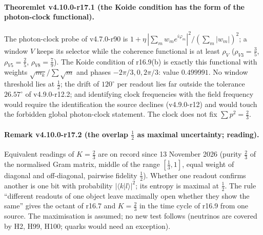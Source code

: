 \paragraph{Theoremlet v4.10.0-r17.1 (the Koide condition has the form of the photon-clock functional).}
The photon-clock probe of v4.7.0-r90 is \(1+\eta\,|\sum_mw_me^{i\varphi_m}|^2/(\sum_m|w_m|)^2\); a window \(V\) keeps its selector while the
coherence functional is at least \(\rho_V\) (\(\rho_{V3}=\tfrac35\), \(\rho_{V5}=\tfrac25\), \(\rho_{V8}=\tfrac79\)).  The Koide condition of r16.9(b) is exactly
this functional with weights \(\sqrt{m_k}/\sum\sqrt m\) and phases \(-2\pi/3,0,2\pi/3\): value \(0.499991\).  No window threshold lies at
\(\tfrac12\); the drift of \(120^\circ\) per readout lies far outside the tolerance \(26.57^\circ\) of v4.9.0-r12.2; and identifying clock
frequencies with the field frequency would require the identification the source declines (v4.9.0-r12) and would touch the
forbidden global photon-clock statement.  The clock does not fix \(\sum p^2=\tfrac23\).

\paragraph{Remark v4.10.0-r17.2 (the overlap \(\tfrac12\) as maximal uncertainty; reading).}
Equivalent readings of \(K=\tfrac23\) are on record since 13 November 2026 (purity \(\tfrac23\) of the normalised Gram matrix, middle of the
range \([\tfrac13,1]\), equal weight of diagonal and off-diagonal, pairwise fidelity \(\tfrac12\)).  Whether one readout confirms another is
one bit with probability \(|\langle k|l\rangle|^2\); its entropy is maximal at \(\tfrac12\).  The rule ``different readouts of one object leave
maximally open whether they show the same'' gives the octant of r16.7 and \(K=\tfrac23\) in the time cycle of r16.9 from one source.  The
maximisation is assumed; no new test follows (neutrinos are covered by H2, H99, H100; quarks would need an exception).

